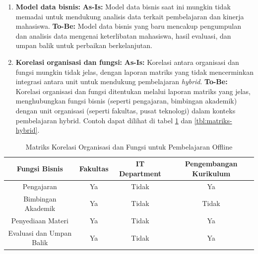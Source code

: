 \begin{enumerate}
	\item \textbf{Model data bisnis:}  
	\textbf{As-Is:} Model data bisnis saat ini mungkin tidak memadai untuk mendukung analisis data terkait pembelajaran dan kinerja mahasiswa.  
	\textbf{To-Be:} Model data bisnis yang baru mencakup pengumpulan dan analisis data mengenai keterlibatan mahasiswa, hasil evaluasi, dan umpan balik untuk perbaikan berkelanjutan.
	
	\item \textbf{Korelasi organisasi dan fungsi:}  
	\textbf{As-Is:} Korelasi antara organisasi dan fungsi mungkin tidak jelas, dengan laporan matriks yang tidak mencerminkan integrasi antara unit untuk mendukung pembelajaran \textit{hybrid}.  
	\textbf{To-Be:} Korelasi organisasi dan fungsi ditentukan melalui laporan matriks yang jelas, menghubungkan fungsi bisnis (seperti pengajaran, bimbingan akademik) dengan unit organisasi (seperti fakultas, pusat teknologi) dalam konteks pembelajaran hybrid. Contoh dapat dilihat di tabel \ref{tbl:matriks-offline} dan \ref{tbl:matriks-hybrid}.
\end{enumerate}


\begin{table}[h]
	\centering
	\caption{Matriks Korelasi Organisasi dan Fungsi untuk Pembelajaran Offline}
	\begin{tabular}{|c|c|c|c|}
		\hline
		\textbf{Fungsi Bisnis} & \textbf{Fakultas} & \textbf{IT Department} & \textbf{Pengembangan Kurikulum} \\ \hline
		Pengajaran            & Ya                  & Tidak                    & Ya                         \\ \hline
		Bimbingan Akademik    & Ya                  & Tidak                    & Tidak                      \\ \hline
		Penyediaan Materi     & Ya                  & Tidak                    & Ya                         \\ \hline
		Evaluasi dan Umpan Balik & Ya              & Tidak                    & Ya                         \\ \hline
	\end{tabular}
	\label{tbl:matriks-offline}
\end{table}

